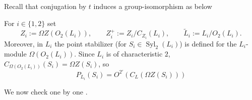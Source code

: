\documentclass{amsart}
\numberwithin{equation}{section}
\theoremstyle{definition}
\theoremstyle{subresult}
\theoremstyle{caseresult}
\renewcommand{\L}{\mathcal{L}}
\newcommand{\Syl}{\operatorname{Syl}}
\newcommand{\wde}{\widetilde}
\newcommand{\<}{\langle}
\renewcommand{\>}{\rangle}
\begin{document}
Recall that conjugation by $t$ induces a group-isomorphism as below
\begin{center}
\end{center}
For $i \in \{1,2\}$ set
\[
	Z_i := \Omega Z(O_2(L_i)), \qquad Z_i^+ := Z_i/C_{Z_i}(L_i), \qquad \wde{L}_i := L_i / O_2(L_i).
\]
Moreover, in $L_i$ the point stabilizer (for $S_i \in \Syl_2(L_i)$) is defined for the $L_i$-module $\Omega (O_2(L_i))$. Since $L_i$ is of characteristic $2$, $C_{\Omega (O_2(L_i))}(S_i) = \Omega Z(S_i)$, so
\[
	P_{L_i}(S_i) = O^{2'}(C_L(\Omega Z(S_i)))
\] 

We now check one by one \cite[Hypothesis 1]{Parmeggiani:2009II}.
\end{document}
